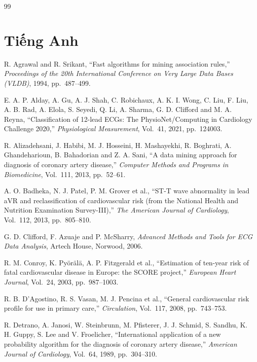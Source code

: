 \documentclass[a4paper,12pt,oneside]{book}
\begin{document}
\begin{thebibliography}{99}

\section*{Tiếng Anh}

R. Agrawal and R. Srikant, ``Fast algorithms for mining association rules,'' {\em Proceedings of the 20th International Conference on Very Large Data Bases (VLDB)}, 1994, pp.~487--499.

E. A. P. Alday, A. Gu, A. J. Shah, C. Robichaux, A. K. I. Wong, C. Liu, F. Liu, A. B. Rad, A. Elola, S. Seyedi, Q. Li, A. Sharma, G. D. Clifford and M. A. Reyna, ``Classification of 12-lead ECGs: The PhysioNet/Computing in Cardiology Challenge 2020,'' {\em Physiological Measurement}, Vol.~41, 2021, pp.~124003.

R. Alizadehsani, J. Habibi, M. J. Hosseini, H. Mashayekhi, R. Boghrati, A. Ghandeharioun, B. Bahadorian and Z. A. Sani, ``A data mining approach for diagnosis of coronary artery disease,'' {\em Computer Methods and Programs in Biomedicine}, Vol.~111, 2013, pp.~52--61.

A. O. Badheka, N. J. Patel, P. M. Grover et al., ``ST-T wave abnormality in lead aVR and reclassification of cardiovascular risk (from the National Health and Nutrition Examination Survey-III),'' {\em The American Journal of Cardiology}, Vol.~112, 2013, pp.~805--810.

G. D. Clifford, F. Azuaje and P. McSharry, {\em Advanced Methods and Tools for ECG Data Analysis}, Artech House, Norwood, 2006.

R. M. Conroy, K. Py\"{o}r\"{a}l\"{a}, A. P. Fitzgerald et al., ``Estimation of ten-year risk of fatal cardiovascular disease in Europe: the SCORE project,'' {\em European Heart Journal}, Vol.~24, 2003, pp.~987--1003.

R. B. D'Agostino, R. S. Vasan, M. J. Pencina et al., ``General cardiovascular risk profile for use in primary care,'' {\em Circulation}, Vol.~117, 2008, pp.~743--753.

R. Detrano, A. Janosi, W. Steinbrunn, M. Pfisterer, J. J. Schmid, S. Sandhu, K. H. Guppy, S. Lee and V. Froelicher, ``International application of a new probability algorithm for the diagnosis of coronary artery disease,'' {\em American Journal of Cardiology}, Vol.~64, 1989, pp.~304--310.


\end{thebibliography}
\end{document}
